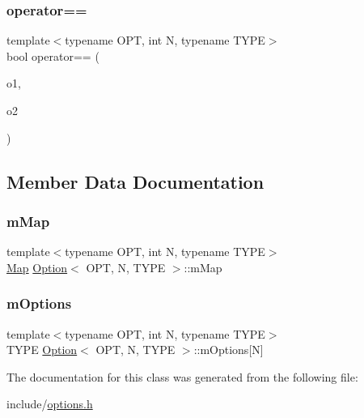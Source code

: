 \subsubsection{\texorpdfstring{operator==}{operator==}}
{\footnotesize\ttfamily template$<$typename O\+PT, int N, typename T\+Y\+PE$>$ \\
bool operator== (\begin{DoxyParamCaption}\item[{const \mbox{\hyperlink{class_option}{Option}}$<$ O\+PT, N, T\+Y\+PE $>$ \&}]{o1,  }\item[{const \mbox{\hyperlink{class_option}{Option}}$<$ O\+PT, N, T\+Y\+PE $>$ \&}]{o2 }\end{DoxyParamCaption})\hspace{0.3cm}{\ttfamily [friend]}}



\subsection{Member Data Documentation}
\mbox{\label{class_option_a0242415a302a1b388209df29e0884ab1}} 
\subsubsection{\texorpdfstring{mMap}{mMap}}
{\footnotesize\ttfamily template$<$typename O\+PT, int N, typename T\+Y\+PE$>$ \\
\mbox{\hyperlink{class_option_a4a16877e4cb71dc27ceb30aee15537c2}{Map}} \mbox{\hyperlink{class_option}{Option}}$<$ O\+PT, N, T\+Y\+PE $>$\+::m\+Map\hspace{0.3cm}{\ttfamily [protected]}}

\mbox{\label{class_option_a7fe66bd61ad037627149c6642b2c69f7}} 
\subsubsection{\texorpdfstring{mOptions}{mOptions}}
{\footnotesize\ttfamily template$<$typename O\+PT, int N, typename T\+Y\+PE$>$ \\
T\+Y\+PE \mbox{\hyperlink{class_option}{Option}}$<$ O\+PT, N, T\+Y\+PE $>$\+::m\+Options\mbox{[}N\mbox{]}\hspace{0.3cm}{\ttfamily [protected]}}



The documentation for this class was generated from the following file\+:\begin{DoxyCompactItemize}
\item 
include/\mbox{\hyperlink{options_8h}{options.\+h}}\end{DoxyCompactItemize}

